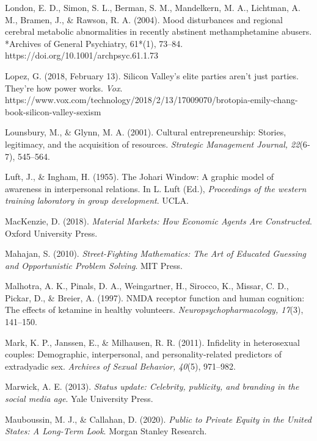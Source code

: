 \begin{thebibliography}{}
    London, E. D., Simon, S. L., Berman, S. M., Mandelkern, M. A., Lichtman, A. M., Bramen, J., \& Rawson, R. A. (2004). Mood disturbances and regional cerebral metabolic abnormalities in recently abstinent methamphetamine abusers. *Archives of General Psychiatry, 61*(1), 73–84. https://doi.org/10.1001/archpsyc.61.1.73

    Lopez, G. (2018, February 13). Silicon Valley’s elite parties aren’t just parties. They’re how power works. \textit{Vox}. https://www.vox.com/technology/2018/2/13/17009070/brotopia-emily-chang-book-silicon-valley-sexism

    Lounsbury, M., \& Glynn, M. A. (2001). Cultural entrepreneurship: Stories, legitimacy, and the acquisition of resources. \textit{Strategic Management Journal, 22}(6‐7), 545–564.

    Luft, J., \& Ingham, H. (1955). The Johari Window: A graphic model of awareness in interpersonal relations. In L. Luft (Ed.), \textit{Proceedings of the western training laboratory in group development}. UCLA.


    MacKenzie, D. (2018). \textit{Material Markets: How Economic Agents Are Constructed}. Oxford University Press.

    Mahajan, S. (2010). \textit{Street-Fighting Mathematics: The Art of Educated Guessing and Opportunistic Problem Solving}. MIT Press.

    Malhotra, A. K., Pinals, D. A., Weingartner, H., Sirocco, K., Missar, C. D., Pickar, D., \& Breier, A. (1997). NMDA receptor function and human cognition: The effects of ketamine in healthy volunteers. \textit{Neuropsychopharmacology, 17}(3), 141–150.

    Mark, K. P., Janssen, E., \& Milhausen, R. R. (2011). Infidelity in heterosexual couples: Demographic, interpersonal, and personality-related predictors of extradyadic sex. \textit{Archives of Sexual Behavior, 40}(5), 971–982.

    Marwick, A. E. (2013). \textit{Status update: Celebrity, publicity, and branding in the social media age}. Yale University Press.

    Mauboussin, M. J., \& Callahan, D. (2020). \textit{Public to Private Equity in the United States: A Long-Term Look}. Morgan Stanley Research.


\end{thebibliography}
